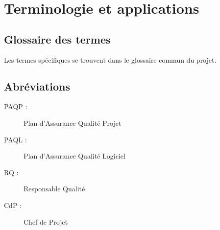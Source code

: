 
\section{Terminologie et applications}

\subsection{Glossaire des termes}

Les termes spécifiques se trouvent dans le glossaire commun du projet.

\subsection{Abréviations}

\begin{description}
    \item[PAQP :]Plan d'Assurance Qualité Projet
    \item[PAQL :]Plan d'Assurance Qualité Logiciel
    \item[RQ :]Responsable Qualité
    \item[CdP :]Chef de Projet
\end{description}

